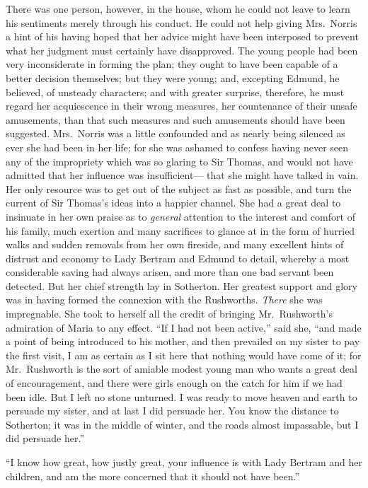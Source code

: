 \documentclass{article}
\begin{document}
There was one person, however, in the house, whom he could
not leave to learn his sentiments merely through his conduct.
He could not help giving Mrs.\ Norris a hint of his having
hoped that her advice might have been interposed to prevent
what her judgment must certainly have disapproved.  The young
people had been very inconsiderate in forming the plan;
they ought to have been capable of a better decision themselves;
but they were young; and, excepting Edmund, he believed,
of unsteady characters; and with greater surprise, therefore,
he must regard her acquiescence in their wrong measures,
her countenance of their unsafe amusements, than that such
measures and such amusements should have been suggested.
Mrs.\ Norris was a little confounded and as nearly being
silenced as ever she had been in her life; for she
was ashamed to confess having never seen any of the
impropriety which was so glaring to Sir Thomas, and would
not have admitted that her influence was insufficient---%
that she might have talked in vain.  Her only resource
was to get out of the subject as fast as possible, and turn
the current of Sir Thomas's ideas into a happier channel.
She had a great deal to insinuate in her own praise
as to \emph{general} attention to the interest and comfort
of his family, much exertion and many sacrifices to glance
at in the form of hurried walks and sudden removals from
her own fireside, and many excellent hints of distrust
and economy to Lady Bertram and Edmund to detail,
whereby a most considerable saving had always arisen,
and more than one bad servant been detected.  But her chief
strength lay in Sotherton.  Her greatest support and glory
was in having formed the connexion with the Rushworths.
\emph{There} she was impregnable.  She took to herself all
the credit of bringing Mr.\ Rushworth's admiration of Maria
to any effect.  ``If I had not been active,'' said she,
``and made a point of being introduced to his mother,
and then prevailed on my sister to pay the first visit,
I am as certain as I sit here that nothing would have
come of it; for Mr.\ Rushworth is the sort of amiable
modest young man who wants a great deal of encouragement,
and there were girls enough on the catch for him if we
had been idle.  But I left no stone unturned.  I was
ready to move heaven and earth to persuade my sister,
and at last I did persuade her.  You know the distance
to Sotherton; it was in the middle of winter, and the roads
almost impassable, but I did persuade her.''

``I know how great, how justly great, your influence
is with Lady Bertram and her children, and am the more
concerned that it should not have been.''
\end{document}

